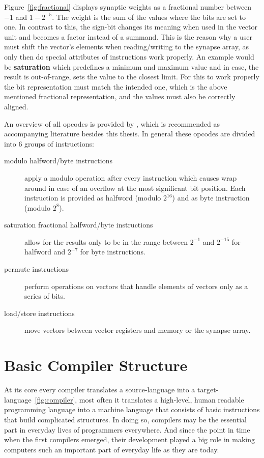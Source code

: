 Figure~\ref{fig:fractional} displays synaptic weights as a fractional number between $-1$ and $1-2^{-5}$.
The weight is the sum of the values where the bits are set to one.
In contrast to this, the sign-bit changes its meaning when used in the vector unit and becomes a factor instead of a summand.
This is the reason why a user must shift the vector's elements when reading/writing to the synapse array, as only then do special attributes of instructions work properly.
An example would be \textbf{saturation} which predefines a minimum and maximum value and in case, the result is out-of-range, sets the value to the closest limit.
For this to work properly the bit representation must match the intended one, which is the above mentioned fractional representation, and the values must also be correctly aligned.

An overview of all opcodes is provided by \cite{nuxmanual}, which is recommended as accompanying literature besides this thesis.
In general these opcodes are divided into 6 groups of instructions:
\begin{description}
    \item[modulo halfword/byte instructions] apply a modulo operation after every instruction which causes wrap around in case of an overflow at the most significant bit position.
        Each instruction is provided as halfword (modulo $2^{16}$) and as byte instruction (modulo $2^{8}$).
    \item[saturation fractional halfword/byte instructions] allow for the results only to be in the range between $2^{-1}$ and $2^{-15}$ for halfword and $2^{-7}$ for byte instructions.
    \item[permute instructions] perform operations on vectors that handle elements of vectors only as a series of bits.
    \item[load/store instructions] move vectors between vector registers and memory or the synapse array.
\end{description}



\section{Basic Compiler Structure}
\label{section:compiler}
At its core every compiler translates a source-language into a target-language~\ref{fig:compiler}, most often it translates a high-level, human readable programming language into a machine language that consists of basic instructions that build complicated structures.
In doing so, compilers may be the essential part in everyday lives of programmers everywhere.
And since the point in time when the first compilers emerged, their development played a big role in making computers such an important part of everyday life as they are today.

